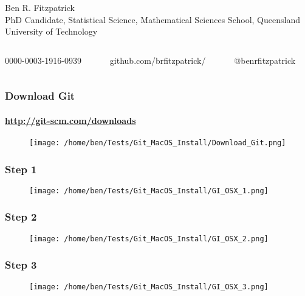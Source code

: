 \documentclass[xcolor=dvipsnames]{beamer}
\begin{document}
\begin{frame}
\begin{figure}
\begin{columns}
\end{columns}
\end{figure}

\small Ben R. Fitzpatrick\\
\tiny PhD Candidate, Statistical Science, Mathematical Sciences School, Queensland University of Technology
\newline
\begin{columns}
\begin{column}{3cm}
\tiny 0000-0003-1916-0939
\end{column}
\begin{column}{3cm}
\tiny github.com/brfitzpatrick/
\end{column}
\begin{column}{3cm}
\tiny @benrfitzpatrick
\end{column}
\end{columns}
\end{frame}

\begin{frame}
\frametitle{Download Git}
\framesubtitle{\url{http://git-scm.com/downloads}}
\begin{center}
\begin{figure}
\texttt{[image: /home/ben/Tests/Git\_MacOS\_Install/Download\_Git.png]}
\end{figure}
\end{center}
\end{frame}


\begin{frame}
\frametitle{Step 1}
\begin{center}
\begin{figure}
\texttt{[image: /home/ben/Tests/Git\_MacOS\_Install/GI\_OSX\_1.png]}
\end{figure}
\end{center}
\end{frame}

\begin{frame}
\frametitle{Step 2}
\begin{center}
\begin{figure}
\texttt{[image: /home/ben/Tests/Git\_MacOS\_Install/GI\_OSX\_2.png]}
\end{figure}
\end{center}
\end{frame}

\begin{frame}
\frametitle{Step 3}
\begin{center}
\begin{figure}
\texttt{[image: /home/ben/Tests/Git\_MacOS\_Install/GI\_OSX\_3.png]}
\end{figure}
\end{center}
\end{frame}
\end{document}
